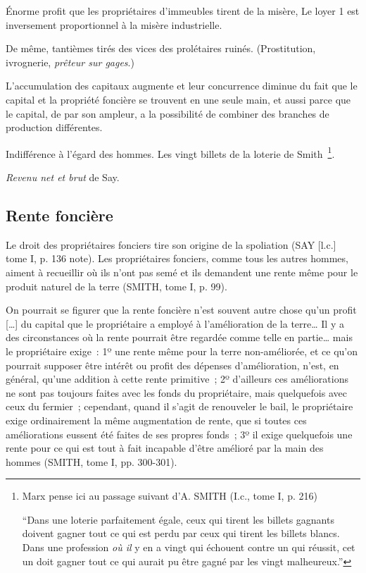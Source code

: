 \documentclass[french,twoside]{book} %
\newcommand\foreign[1]{\emph{#1}}
\newenvironment{quoteblock}%
  {\begin{quoting}}
  {\end{quoting}}
\newenvironment{quotebar}{%
    \def\FrameCommand{{\color{rubric!10!}\vrule width 0.5em} \hspace{0.9em}}%
    \def\OuterFrameSep{\itemsep} %
    \MakeFramed {\advance\hsize-\width \FrameRestore}
  }%
  {%
    \endMakeFramed
  }
\renewenvironment{quoteblock}%
  {%
    \savenotes
    \setstretch{0.9}
    \normalfont
    \begin{quotebar}
  }
  {%
    \end{quotebar}
    \spewnotes
  }
\begin{document}
\noindent Énorme profit que les propriétaires d’immeubles tirent de la misère, Le loyer 1 est inversement proportionnel à la misère industrielle.\par
De même, tantièmes tirés des vices des prolétaires ruinés. (Prostitution, ivrognerie, \emph{prêteur sur gages}.)\par
L’accumulation des capitaux augmente et leur concurrence diminue du fait que le capital et la propriété foncière se trouvent en une seule main, et aussi parce que le capital, de par son ampleur, a la possibilité de combiner des branches de production différentes.\par
Indifférence à l’égard des hommes. Les vingt billets de la loterie de Smith \footnote{ \noindent Marx pense ici au passage suivant d’A. SMITH (I.c., tome I, p. 216)\par
 “Dans une loterie parfaitement égale, ceux qui tirent les billets gagnants doivent gagner tout ce qui est perdu par ceux qui tirent les billets blancs. Dans une profession \emph{où il} y en a vingt qui échouent contre un qui réussit, cet un doit gagner tout ce qui aurait pu être gagné par les vingt malheureux.”
}.\par
\foreign{Revenu net et brut} de Say.
\subsection[{Rente foncière}]{Rente foncière}

\begin{quoteblock}
 \noindent [I] Le droit des propriétaires fonciers tire son origine de la spoliation (SAY [l.c.] tome I, p. 136 note). Les propriétaires fonciers, comme tous les autres hommes, aiment à recueillir où ils n’ont pas semé et ils demandent une rente même pour le produit naturel de la terre (SMITH, tome I, p. 99).\par
 On pourrait se figurer que la rente foncière n’est souvent autre chose qu’un profit […] du capital que le propriétaire a employé à l’amélioration de la terre… Il y a des circonstances où la rente pourrait être regardée comme telle en partie… mais le propriétaire exige : 1º une rente même pour la terre non-améliorée, et ce qu’on pourrait supposer être intérêt ou profit des dépenses d’amélioration, n’est, en général, qu’une addition à cette rente primitive ; 2º d’ailleurs ces améliorations ne sont pas toujours faites avec les fonds du propriétaire, mais quelquefois avec ceux du fermier ; cependant, quand il s’agit de renouveler le bail, le propriétaire exige ordinairement la même augmentation de rente, que si toutes ces améliorations eussent été faites de ses propres fonds ; 3º il exige quelquefois une rente pour ce qui est tout à fait incapable d’être amélioré par la main des hommes (SMITH, tome I, pp. 300-301).
 \end{quoteblock}
\end{document}
